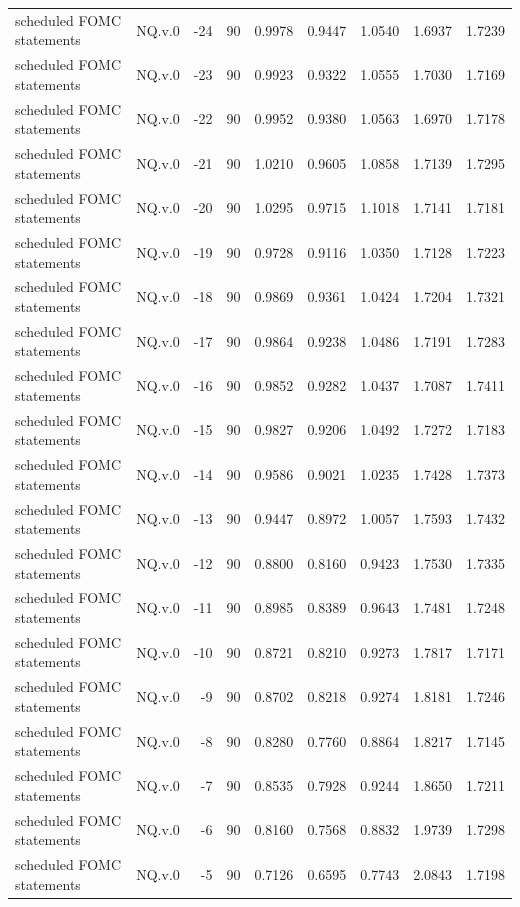 \begin{tabular}{llrrrrrrr}
scheduled FOMC statements & NQ.v.0 & -24 & 90 & 0.9978 & 0.9447 & 1.0540 & 1.6937 & 1.7239 \\
scheduled FOMC statements & NQ.v.0 & -23 & 90 & 0.9923 & 0.9322 & 1.0555 & 1.7030 & 1.7169 \\
scheduled FOMC statements & NQ.v.0 & -22 & 90 & 0.9952 & 0.9380 & 1.0563 & 1.6970 & 1.7178 \\
scheduled FOMC statements & NQ.v.0 & -21 & 90 & 1.0210 & 0.9605 & 1.0858 & 1.7139 & 1.7295 \\
scheduled FOMC statements & NQ.v.0 & -20 & 90 & 1.0295 & 0.9715 & 1.1018 & 1.7141 & 1.7181 \\
scheduled FOMC statements & NQ.v.0 & -19 & 90 & 0.9728 & 0.9116 & 1.0350 & 1.7128 & 1.7223 \\
scheduled FOMC statements & NQ.v.0 & -18 & 90 & 0.9869 & 0.9361 & 1.0424 & 1.7204 & 1.7321 \\
scheduled FOMC statements & NQ.v.0 & -17 & 90 & 0.9864 & 0.9238 & 1.0486 & 1.7191 & 1.7283 \\
scheduled FOMC statements & NQ.v.0 & -16 & 90 & 0.9852 & 0.9282 & 1.0437 & 1.7087 & 1.7411 \\
scheduled FOMC statements & NQ.v.0 & -15 & 90 & 0.9827 & 0.9206 & 1.0492 & 1.7272 & 1.7183 \\
scheduled FOMC statements & NQ.v.0 & -14 & 90 & 0.9586 & 0.9021 & 1.0235 & 1.7428 & 1.7373 \\
scheduled FOMC statements & NQ.v.0 & -13 & 90 & 0.9447 & 0.8972 & 1.0057 & 1.7593 & 1.7432 \\
scheduled FOMC statements & NQ.v.0 & -12 & 90 & 0.8800 & 0.8160 & 0.9423 & 1.7530 & 1.7335 \\
scheduled FOMC statements & NQ.v.0 & -11 & 90 & 0.8985 & 0.8389 & 0.9643 & 1.7481 & 1.7248 \\
scheduled FOMC statements & NQ.v.0 & -10 & 90 & 0.8721 & 0.8210 & 0.9273 & 1.7817 & 1.7171 \\
scheduled FOMC statements & NQ.v.0 & -9 & 90 & 0.8702 & 0.8218 & 0.9274 & 1.8181 & 1.7246 \\
scheduled FOMC statements & NQ.v.0 & -8 & 90 & 0.8280 & 0.7760 & 0.8864 & 1.8217 & 1.7145 \\
scheduled FOMC statements & NQ.v.0 & -7 & 90 & 0.8535 & 0.7928 & 0.9244 & 1.8650 & 1.7211 \\
scheduled FOMC statements & NQ.v.0 & -6 & 90 & 0.8160 & 0.7568 & 0.8832 & 1.9739 & 1.7298 \\
scheduled FOMC statements & NQ.v.0 & -5 & 90 & 0.7126 & 0.6595 & 0.7743 & 2.0843 & 1.7198 \\

\end{tabular}
